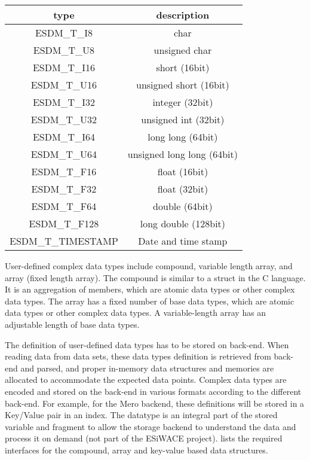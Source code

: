 \begin{center}
	\begin{tabular}{|c|c|}
		\hline
		type & description \\
		\hline
		ESDM\_T\_I8     & char                           \\
		ESDM\_T\_U8    & unsigned char                  \\
		ESDM\_T\_I16    & short (16bit)                  \\
		ESDM\_T\_U16   & unsigned short (16bit)         \\
		ESDM\_T\_I32      & integer (32bit)                \\
		ESDM\_T\_U32     & unsigned int (32bit)           \\
		ESDM\_T\_I64    & long long (64bit)              \\
		ESDM\_T\_U64   & unsigned long long (64bit)     \\
		ESDM\_T\_F16    & float (16bit)                  \\
		ESDM\_T\_F32    & float (32bit)                  \\
		ESDM\_T\_F64   & double (64bit)                 \\
		ESDM\_T\_F128 & long double (128bit)           \\
		ESDM\_T\_TIMESTAMP & Date and time stamp \\
		\hline
	\end{tabular}
\end{center}

User-defined complex data types include compound, variable length array,
and array (fixed length array).
The compound is similar to a struct in the C language.
It is an aggregation of members, which are atomic data types or other complex data types.
The array has a fixed number of base data types, which are atomic data types
or other complex data types.
A variable-length array has an adjustable length of base data types.

The definition of user-defined data types has to be stored on back-end. When reading data from data sets, these data types definition is retrieved from back-end
and parsed, and proper in-memory data structures and memories are allocated to
accommodate the expected data points.
Complex data types are encoded and stored on the back-end in various formats according
to the different back-end.
For example, for the Mero backend, these definitions will be stored in a Key/Value pair in an index.
The datatype is an integral part of the stored variable and fragment to allow the storage backend to understand the data and process it on demand (not part of the ESiWACE project).
 lists the required interfaces for the compound, array and key-value based data structures.




